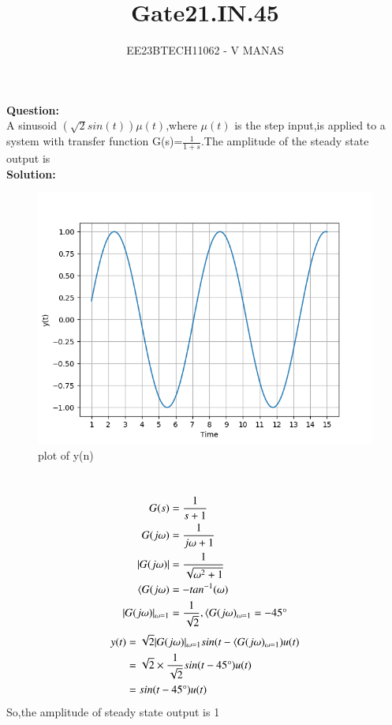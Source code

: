 \documentclass[journal,12pt,twocolumn]{IEEEtran}
\theoremstyle{remark}
\begin{document}

\vspace{3cm}

\title{Gate21.IN.45}
\author{EE23BTECH11062 - V MANAS}
\maketitle
\newpage

\bigskip
\textbf{Question:}\\A sinusoid $(\sqrt{2}sin(t))\mu(t)$,where $\mu(t)$ is the step input,is applied to a system with transfer function G(s)=$\frac{1}{1+s}$.The amplitude of the steady state output is\\
\textbf{Solution:}
\begin{figure}[h]
    \centering
    \includegraphics[width=1.0\linewidth]{figs/graph.png}
    \caption{plot of y(n)}
\end{figure}\\
\begin{align}
    G(s)&=\frac{1}{s+1}\\
    G(j\omega)&=\frac{1}{j\omega+1}\\
    |G(j\omega)|&=\frac{1}{\sqrt{\omega^2+1}}\\
    \langle G(j\omega)&=-tan^{-1}(\omega)\\
    |G(j\omega)|_{\omega=1}&=\frac{1}{\sqrt{2}},\langle G(j\omega)_{\omega=1}=-45\degree
\end{align}
\begin{align}
    y(t)&=\sqrt{2}|G(j\omega)|_{\omega=1}sin(t-\langle G(j\omega)_{\omega=1})u(t)\\
    &=\sqrt{2}\times\frac{1}{\sqrt{2}}sin(t-45\degree)u(t)\\
    &=sin(t-45\degree)u(t)
\end{align}
So,the amplitude of steady state output is 1
\end{document}
